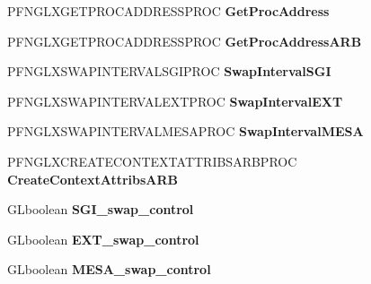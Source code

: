 \begin{DoxyCompactItemize}
\item 
\hypertarget{struct__GLFWlibraryGLX_ac15180b7329f18095e983a8904aec17a}{}P\+F\+N\+G\+L\+X\+G\+E\+T\+P\+R\+O\+C\+A\+D\+D\+R\+E\+S\+S\+P\+R\+O\+C {\bfseries Get\+Proc\+Address}\label{struct__GLFWlibraryGLX_ac15180b7329f18095e983a8904aec17a}

\item 
\hypertarget{struct__GLFWlibraryGLX_ad13b458a2f56f64c4ae0613575514f29}{}P\+F\+N\+G\+L\+X\+G\+E\+T\+P\+R\+O\+C\+A\+D\+D\+R\+E\+S\+S\+P\+R\+O\+C {\bfseries Get\+Proc\+Address\+A\+R\+B}\label{struct__GLFWlibraryGLX_ad13b458a2f56f64c4ae0613575514f29}

\item 
\hypertarget{struct__GLFWlibraryGLX_a81c798f3f9f01bfd3443d933f4b502b1}{}P\+F\+N\+G\+L\+X\+S\+W\+A\+P\+I\+N\+T\+E\+R\+V\+A\+L\+S\+G\+I\+P\+R\+O\+C {\bfseries Swap\+Interval\+S\+G\+I}\label{struct__GLFWlibraryGLX_a81c798f3f9f01bfd3443d933f4b502b1}

\item 
\hypertarget{struct__GLFWlibraryGLX_ab19310e760f99be6f2f698cf697606ed}{}P\+F\+N\+G\+L\+X\+S\+W\+A\+P\+I\+N\+T\+E\+R\+V\+A\+L\+E\+X\+T\+P\+R\+O\+C {\bfseries Swap\+Interval\+E\+X\+T}\label{struct__GLFWlibraryGLX_ab19310e760f99be6f2f698cf697606ed}

\item 
\hypertarget{struct__GLFWlibraryGLX_a6f20158532db285c651e804bdda01137}{}P\+F\+N\+G\+L\+X\+S\+W\+A\+P\+I\+N\+T\+E\+R\+V\+A\+L\+M\+E\+S\+A\+P\+R\+O\+C {\bfseries Swap\+Interval\+M\+E\+S\+A}\label{struct__GLFWlibraryGLX_a6f20158532db285c651e804bdda01137}

\item 
\hypertarget{struct__GLFWlibraryGLX_a08d7c051b97ca81f83058bb49e17123c}{}P\+F\+N\+G\+L\+X\+C\+R\+E\+A\+T\+E\+C\+O\+N\+T\+E\+X\+T\+A\+T\+T\+R\+I\+B\+S\+A\+R\+B\+P\+R\+O\+C {\bfseries Create\+Context\+Attribs\+A\+R\+B}\label{struct__GLFWlibraryGLX_a08d7c051b97ca81f83058bb49e17123c}

\item 
\hypertarget{struct__GLFWlibraryGLX_af491cb45c1eb2aebda23d3e910bff1e9}{}G\+Lboolean {\bfseries S\+G\+I\+\_\+swap\+\_\+control}\label{struct__GLFWlibraryGLX_af491cb45c1eb2aebda23d3e910bff1e9}

\item 
\hypertarget{struct__GLFWlibraryGLX_a4bf93969fc75fa809a86ede38a2abf5f}{}G\+Lboolean {\bfseries E\+X\+T\+\_\+swap\+\_\+control}\label{struct__GLFWlibraryGLX_a4bf93969fc75fa809a86ede38a2abf5f}

\item 
\hypertarget{struct__GLFWlibraryGLX_a1cdcd2ae5efc91b143cb378421864e26}{}G\+Lboolean {\bfseries M\+E\+S\+A\+\_\+swap\+\_\+control}\label{struct__GLFWlibraryGLX_a1cdcd2ae5efc91b143cb378421864e26}


\end{DoxyCompactItemize}
